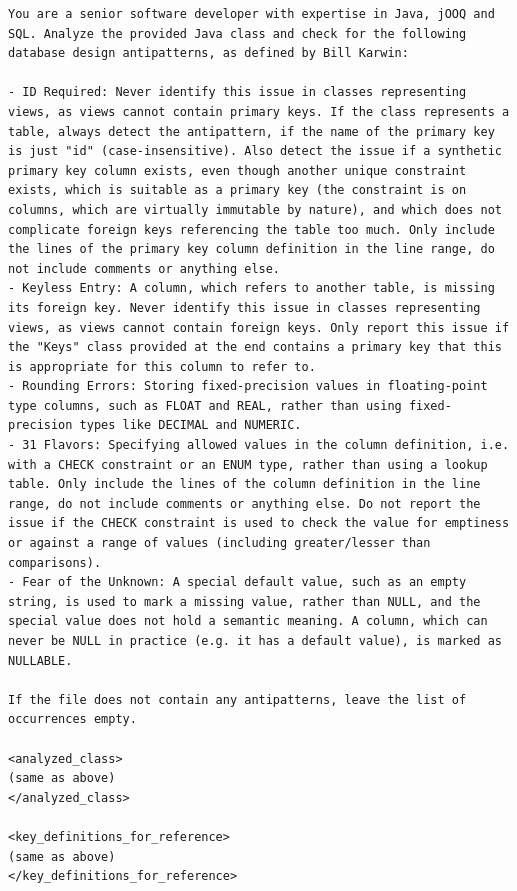 \captionsetup{type=figure}
\begin{lstlisting}[frame=none, basicstyle=\small, breaklines=true, breakatwhitespace=false, breakindent=0pt]
You are a senior software developer with expertise in Java, jOOQ and SQL. Analyze the provided Java class and check for the following database design antipatterns, as defined by Bill Karwin:

- ID Required: Never identify this issue in classes representing views, as views cannot contain primary keys. If the class represents a table, always detect the antipattern, if the name of the primary key is just "id" (case-insensitive). Also detect the issue if a synthetic primary key column exists, even though another unique constraint exists, which is suitable as a primary key (the constraint is on columns, which are virtually immutable by nature), and which does not complicate foreign keys referencing the table too much. Only include the lines of the primary key column definition in the line range, do not include comments or anything else.
- Keyless Entry: A column, which refers to another table, is missing its foreign key. Never identify this issue in classes representing views, as views cannot contain foreign keys. Only report this issue if the "Keys" class provided at the end contains a primary key that this is appropriate for this column to refer to.
- Rounding Errors: Storing fixed-precision values in floating-point type columns, such as FLOAT and REAL, rather than using fixed-precision types like DECIMAL and NUMERIC.
- 31 Flavors: Specifying allowed values in the column definition, i.e. with a CHECK constraint or an ENUM type, rather than using a lookup table. Only include the lines of the column definition in the line range, do not include comments or anything else. Do not report the issue if the CHECK constraint is used to check the value for emptiness or against a range of values (including greater/lesser than comparisons).
- Fear of the Unknown: A special default value, such as an empty string, is used to mark a missing value, rather than NULL, and the special value does not hold a semantic meaning. A column, which can never be NULL in practice (e.g. it has a default value), is marked as NULLABLE.

If the file does not contain any antipatterns, leave the list of occurrences empty.

<analyzed_class>
(same as above)
</analyzed_class>

<key_definitions_for_reference>
(same as above)
</key_definitions_for_reference>


\end{lstlisting}

